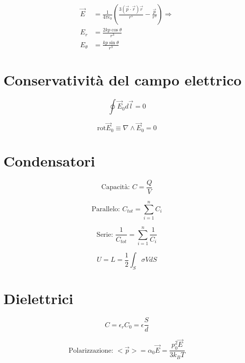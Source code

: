 \documentclass[a4paper,11pt]{article}
\begin{document}
\begin{multicols}{3}
		\begin{align*}
			\vec{E} &= \frac{1}{4\pi\epsilon_0} \left(\frac{3(\vec{p}\cdot\vec{r})\vec{r}}{r^5} - \frac{\vec{p}}{r^3}\right) \Rightarrow \\
			E_r &= \frac{2kp\cos\theta}{r^3} \\
			E_\theta &= \frac{kp\sin\theta}{r^3}			
		\end{align*}
		
		\section{Conservatività del campo elettrico}
		
		\begin{equation}
			\oint\vec{E}_0d\vec{l}=0
		\end{equation}
	
		\begin{equation}
			\text{rot}\vec{E}_0 \equiv \nabla \land \vec{E}_0 = 0
		\end{equation}
	
	
		\section{Condensatori}
		\begin{equation}
			\text{Capacità: } C=\frac{Q}{V}
		\end{equation}
		
		\begin{equation}
			\text{Parallelo: } C_{tot} = \sum_{i=1}^{n}C_{i}
		\end{equation}
	
		\begin{equation}
			\text{Serie: } \frac{1}{C_{tot}} = \sum_{i=1}^{n}\frac{1}{C_{i}}
		\end{equation}
	
		\begin{equation}
			U = L = \frac{1}{2} \int_{S}\sigma VdS
		\end{equation}
	
		\section{Dielettrici}
		\begin{equation}
			C = \epsilon_rC_0 = \epsilon\frac{S}{d}
		\end{equation}
	
		\begin{equation}
			\text{Polarizzazione: } <\vec{p}> = \alpha_0\vec{E} = \frac{p_0^2\vec{E}}{3k_BT}
		\end{equation}
	

\end{multicols}
\end{document}
